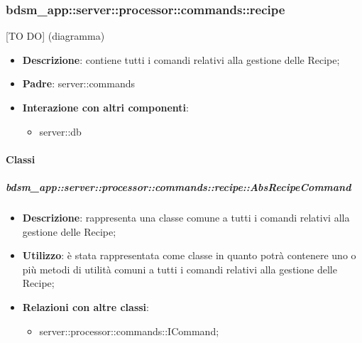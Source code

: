       \subsubsection{bdsm\_app::server::processor::commands::recipe} %
      \label{ssub:bdsm_app_server_processor_commands_recipe}
      [TO DO] (diagramma) \newline \newline

      \begin{itemize}
        \item \textbf{Descrizione}: contiene tutti i comandi relativi alla gestione delle Recipe;
        \item \textbf{Padre}: server::commands
        \item \textbf{Interazione con altri componenti}:
          \begin{itemize}
            \item server::db
          \end{itemize}
      \end{itemize}

        \paragraph{Classi} %

        \subparagraph{bdsm\_app::server::processor::commands::recipe::AbsRecipeCommand} %
        \label{subp:bdsm_app_server_processor_commands_recipe_absrecipecommand}
        \begin{itemize}
          \item \textbf{Descrizione}: rappresenta una classe comune a tutti i comandi relativi alla gestione delle Recipe;
          \item \textbf{Utilizzo}: è stata rappresentata come classe in quanto potrà contenere uno o più metodi di utilità comuni a tutti i comandi relativi alla gestione delle Recipe;
          \item \textbf{Relazioni con altre classi}:
            \begin{itemize}
              \item server::processor::commands::ICommand;
            \end{itemize}
        \end{itemize}

